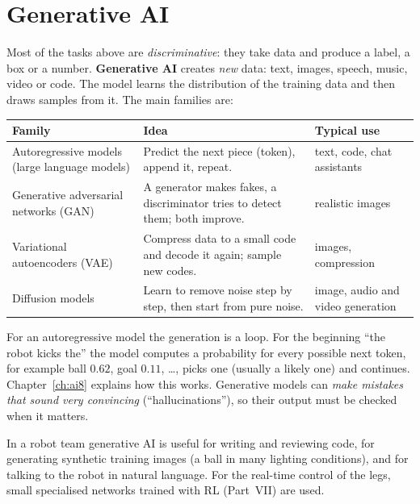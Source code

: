 \section*{Generative AI}
Most of the tasks above are \emph{discriminative}: they take data and produce a label, a box or a number. \textbf{Generative AI} creates \emph{new} data: text, images, speech, music, video or code. The model learns the distribution of the training data and then draws samples from it. The main families are:

\begin{center}
\renewcommand{\arraystretch}{1.3}
\begin{tabular}{p{3.3cm}p{6.2cm}p{4.6cm}}
\textbf{Family} & \textbf{Idea} & \textbf{Typical use}\\ \hline
Autoregressive models (large language models) & Predict the next piece (token), append it, repeat. & text, code, chat assistants\\
Generative adversarial networks (GAN) & A generator makes fakes, a discriminator tries to detect them; both improve. & realistic images\\
Variational autoencoders (VAE) & Compress data to a small code and decode it again; sample new codes. & images, compression\\
Diffusion models & Learn to remove noise step by step, then start from pure noise. & image, audio and video generation\\
\end{tabular}
\end{center}

For an autoregressive model the generation is a loop. For the beginning ``the robot kicks the'' the model computes a probability for every possible next token, for example ball $0.62$, goal $0.11$, \dots, picks one (usually a likely one) and continues. Chapter~\ref{ch:ai8} explains how this works. Generative models can \emph{make mistakes that sound very convincing} (``hallucinations''), so their output must be checked when it matters.

\begin{aibox}
In a robot team generative AI is useful for writing and reviewing code, for generating synthetic training images (a ball in many lighting conditions), and for talking to the robot in natural language. For the real-time control of the legs, small specialised networks trained with RL (Part~VII) are used.
\end{aibox}

